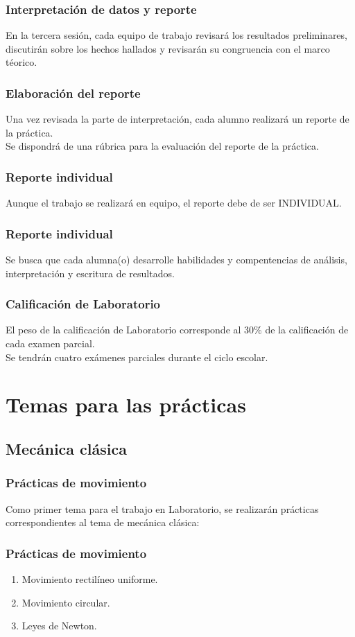\documentclass[14pt]{beamer}
\begin{document}
\begin{frame}
\frametitle{Interpretación de datos y reporte}
En la tercera sesión, cada equipo de trabajo revisará los resultados preliminares, discutirán sobre los hechos hallados y revisarán su congruencia con el marco téorico.
\end{frame}
\begin{frame}
\frametitle{Elaboración del reporte}
Una vez revisada la parte de interpretación, cada alumno realizará un reporte de la práctica.
\\
\bigskip
\pause
Se dispondrá de una rúbrica para la evaluación del reporte de la práctica.
\end{frame}
\begin{frame}
\frametitle{Reporte individual}
Aunque el trabajo se realizará en equipo, el reporte debe de ser INDIVIDUAL.
\end{frame}
\begin{frame}
\frametitle{Reporte individual}
Se busca que cada alumna(o) desarrolle habilidades y compentencias de análisis, interpretación y escritura de resultados.
\end{frame}
\begin{frame}
\frametitle{Calificación de Laboratorio}
El peso de la calificación de Laboratorio corresponde al $30 \%$ de la calificación de cada examen parcial.
\\
\bigskip
\pause
Se tendrán cuatro exámenes parciales durante el ciclo escolar.
\end{frame}

\section{Temas para las prácticas}
\subsection{Mecánica clásica}

\begin{frame}
\frametitle{Prácticas de movimiento}
Como primer tema para el trabajo en Laboratorio, se realizarán prácticas correspondientes al tema de mecánica clásica:
\end{frame}
\begin{frame}
\frametitle{Prácticas de movimiento}
\begin{enumerate}[<+->]
\item Movimiento rectilíneo uniforme.
\item Movimiento circular.
\item Leyes de Newton.
\end{enumerate}
\end{frame}
\end{document}
